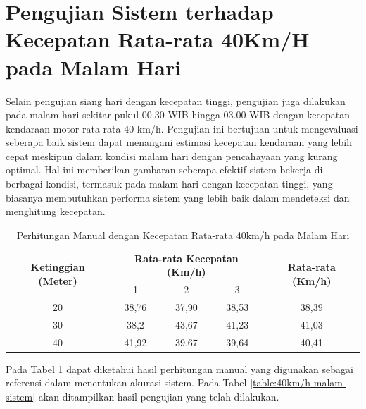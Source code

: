 \section{Pengujian Sistem terhadap Kecepatan Rata-rata 40Km/H pada Malam Hari}

Selain pengujian siang hari dengan kecepatan tinggi, pengujian juga dilakukan pada malam hari sekitar pukul 00.30 WIB hingga 03.00 WIB dengan kecepatan kendaraan motor rata-rata 40 km/h. Pengujian ini bertujuan untuk mengevaluasi seberapa baik sistem dapat menangani estimasi kecepatan kendaraan yang lebih cepat meskipun dalam kondisi malam hari dengan pencahayaan yang kurang optimal. Hal ini memberikan gambaran seberapa efektif sistem bekerja di berbagai kondisi, termasuk pada malam hari dengan kecepatan tinggi, yang biasanya membutuhkan performa sistem yang lebih baik dalam mendeteksi dan menghitung kecepatan.

\begin{table}[H]
	\caption{Perhitungan Manual dengan Kecepatan Rata-rata 40km/h pada Malam Hari}
    \label{table:40km/h-malam-manual}
	\centering
	\begin{tabular}{|c|c|c|c|c|}
		\hline
		\multirow{2}{*}{\textbf{Ketinggian (Meter)}} & \multicolumn{3}{c|}{\textbf{Rata-rata Kecepatan (Km/h)}} & \multirow{2}{*}{\textbf{Rata-rata (Km/h)}} \\ \cline{2-4}
		& 1 & 2 & 3 & \\ \hline
		20 & 38,76 & 37,90 & 38,53 & 38,39 \\
		30 & 38,2 & 43,67 & 41,23 & 41,03 \\
		40 & 41,92 & 39,67 & 39,64 & 40,41 \\ \hline
	\end{tabular}
\end{table}
\vspace{-10pt}

Pada Tabel \ref{table:40km/h-malam-manual} dapat diketahui hasil perhitungan manual yang digunakan sebagai referensi dalam menentukan akurasi sistem. Pada Tabel \ref{table:40km/h-malam-sistem} akan ditampilkan hasil pengujian yang telah dilakukan.

